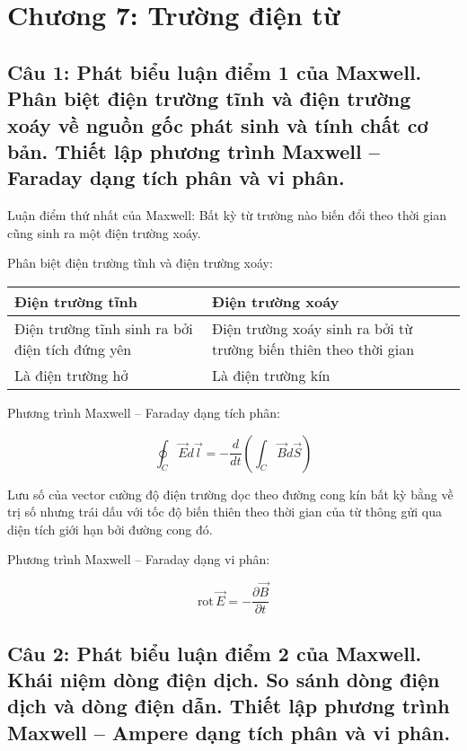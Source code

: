 \section[Chương 7]{Chương 7: Trường điện từ}

\subsection[Câu 1]{Câu 1: Phát biểu luận điểm 1 của Maxwell. Phân biệt điện trường tĩnh và điện trường xoáy về nguồn gốc phát sinh và tính chất cơ bản. Thiết lập phương trình Maxwell -- Faraday dạng tích phân và vi phân.}

Luận điểm thứ nhất của Maxwell: Bất kỳ từ trường nào biến đổi theo thời gian cũng sinh ra một điện trường xoáy.

Phân biệt điện trường tĩnh và điện trường xoáy:

\begin{table}[H]
\centering
\begin{tabular}{|p{6cm}|p{6cm}|}
\hline
Điện trường tĩnh & Điện trường xoáy \\ \hline\hline
Điện trường tĩnh sinh ra bởi điện tích đứng yên & Điện trường xoáy sinh ra bởi từ trường biến thiên theo thời gian \\ \hline
Là điện trường hở & Là điện trường kín \\ \hline
\end{tabular}
\end{table}

Phương trình Maxwell -- Faraday dạng tích phân:

\begin{equation*}
  \oint_C \vec{E}d\vec{l} = -\frac{d}{dt} \left( \int_C \vec{B}d\vec{S} \right)
\end{equation*}

Lưu số của vector cường độ điện trường dọc theo đường cong kín bất kỳ bằng về trị số nhưng trái dấu với tốc độ biến thiên theo thời gian của từ thông gửi qua diện tích giới hạn bởi đường cong đó.

Phương trình Maxwell -- Faraday dạng vi phân:

\begin{equation*}
  \text{rot}\,\vec{E} = -\frac{\partial\vec{B}}{\partial t}
\end{equation*}

\subsection[Câu 2]{Câu 2: Phát biểu luận điểm 2 của Maxwell. Khái niệm dòng điện dịch. So sánh
dòng điện dịch và dòng điện dẫn. Thiết lập phương trình Maxwell -- Ampere dạng tích phân và vi phân.}

